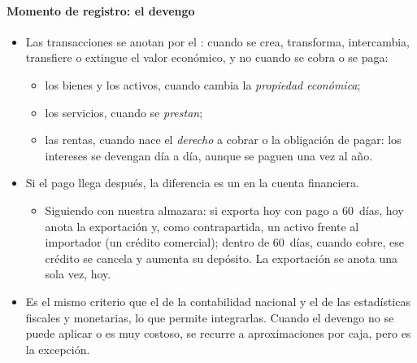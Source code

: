 \documentclass[11pt]{article}
\begin{document}
\paragraph{Momento de registro: el devengo}
\begin{itemize}
\item Las transacciones se anotan por el : cuando se crea, transforma, intercambia, transfiere o extingue el valor económico, y no cuando se cobra o se paga\nocite{FMI2009MBP6}:
  \begin{itemize}
  \item los bienes y los activos, cuando cambia la \emph{propiedad económica};
  \item los servicios, cuando se \emph{prestan};
  \item las rentas, cuando nace el \emph{derecho} a cobrar o la obligación de pagar: los intereses se devengan día a día, aunque se paguen una vez al año.
  \end{itemize}
\item Si el pago llega después, la diferencia es un  en la cuenta financiera.
  \begin{itemize}
  \item Siguiendo con nuestra almazara: si exporta hoy con pago a 60~días, hoy anota la exportación y, como contrapartida, un activo frente al importador (un crédito comercial); dentro de 60~días, cuando cobre, ese crédito se cancela y aumenta su depósito. La exportación se anota una sola vez, hoy.
  \end{itemize}
\item Es el mismo criterio que el de la contabilidad nacional y el de las estadísticas fiscales y monetarias, lo que permite integrarlas. Cuando el devengo no se puede aplicar o es muy costoso, se recurre a aproximaciones por caja, pero es la excepción.
\end{itemize}
\end{document}

